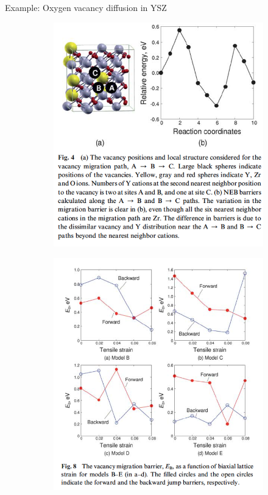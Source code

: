 \documentclass[aspectratio=169]{beamer}
\begin{document}
\begin{frame}{Example: Oxygen vacancy diffusion in YSZ}
\begin{figure}
    \centering
    \begin{subfigure}{0.45\textwidth}
        \centering
        \includegraphics[width=0.8\linewidth]{lectures/figures/12-O_diffusion_in_YSZ_1.png}
    \end{subfigure}
    \begin{subfigure}{0.45\textwidth}
        \centering
        \includegraphics[width=0.8\linewidth]{lectures/figures/12-O_diffusion_in_YSZ_2.png}
    \end{subfigure}
    \caption{\cite{kushimaOxygenIonDiffusivity2010}}
\end{figure} 
\end{frame} 
\end{document}
